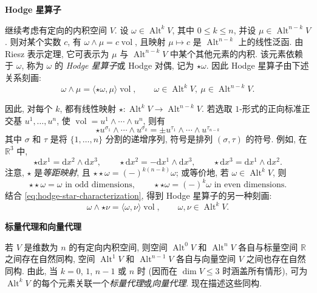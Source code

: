 \medskip\noindent\textbf{Hodge {星算子}}\par
继续考虑有定向的内积空间 $V$. 设 $\omega\in\operatorname{Alt}^kV$, 其中 $0\leq k\leq n$, 并设 $\mu\in\operatorname{Alt}^{n-k}V$. 则对某个实数 $c$, 有 $\omega\wedge\mu=c\operatorname{vol}$, 且映射 $\mu\mapsto c$ 是 $\operatorname{Alt}^{n-k}$ 上的线性泛函. 由 Riesz 表示定理, 它可表示为 $\mu$ 与 $\operatorname{Alt}^{n-k}V$ 中某个其他元素的内积. 该元素依赖于 $\omega$, 称为 $\omega$ 的 \emph{Hodge 星算子}或 Hodge 对偶, 记为 $\star\omega$. 因此 Hodge 星算子由下述关系刻画:
\begin{equation}\label{eq:hodge-star-characterization}
\omega\wedge\mu=\langle\star\omega,\mu\rangle\operatorname{vol},\qquad\omega\in\operatorname{Alt}^kV,\ \mu\in\operatorname{Alt}^{n-k}V.
\end{equation}

因此, 对每个 $k$, 都有线性映射 $\star:\operatorname{Alt}^kV\to\operatorname{Alt}^{n-k}V$. 若选取 $1$-形式的正向标准正交基 $u^1,\ldots,u^n$, 使 $\operatorname{vol}=u^1\wedge\cdots\wedge u^n$, 则有
\[
\star u^{\sigma_1}\wedge\cdots\wedge u^{\sigma_k}=\pm u^{\tau_1}\wedge\cdots\wedge u^{\tau_{n-k}}
\]
其中 $\sigma$ 和 $\tau$ 是将 $\{1,\ldots,n\}$ 分割的递增序列, 符号是排列 $(\sigma,\tau)$ 的符号. 例如, 在 $\mathbb R^3$ 中,
\[
\star \mathrm{d}x^1=\mathrm{d}x^2\wedge \mathrm{d}x^3,\qquad\star \mathrm{d}x^2=-\mathrm{d}x^1\wedge \mathrm{d}x^3,\qquad\star \mathrm{d}x^3=\mathrm{d}x^1\wedge \mathrm{d}x^2.
\]
注意, $\star$ 是\emph{等距映射}, 且 $\star\star\omega=(-)^{k(n-k)}\omega$; 或等价地, 若 $\omega\in\operatorname{Alt}^kV$, 则
\[
\star\star\omega=\omega\text{ in odd dimensions},\qquad\star\star\omega=(-)^k\omega\text{ in even dimensions}.
\]
结合 \eqref{eq:hodge-star-characterization}, 得到 Hodge 星算子的另一种刻画:
\begin{equation}\label{eq:hodge-star-inner-product}
\omega\wedge\star\nu=\langle\omega,\nu\rangle\operatorname{vol},\qquad\omega,\nu\in\operatorname{Alt}^kV.
\end{equation}

\medskip\noindent\textbf{{标量代理和向量代理}}\par
若 $V$ 是维数为 $n$ 的有定向内积空间, 则空间 $\operatorname{Alt}^0V$ 和 $\operatorname{Alt}^nV$ 各自与标量空间 $\mathbb R$ 之间存在自然同构, 空间 $\operatorname{Alt}^1V$ 和 $\operatorname{Alt}^{n-1}V$ 各自与向量空间 $V$ 之间也存在自然同构. 由此, 当 $k=0$, $1$, $n-1$ 或 $n$ 时 (因而在 $\dim V\leq3$ 时涵盖所有情形), 可为 $\operatorname{Alt}^kV$ 的每个元素关联一个\emph{标量代理}或\emph{向量代理}. 现在描述这些同构.

